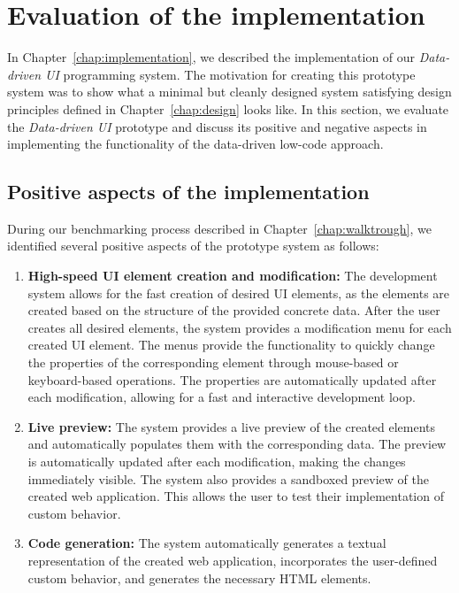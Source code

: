 \section{Evaluation of the implementation}

In Chapter~\ref{chap:implementation}, we described the implementation of our \emph{Data-driven UI} programming system.
The motivation for creating this prototype system was to show what a minimal but cleanly designed system satisfying design principles defined in Chapter~\ref{chap:design} looks like.
In this section, we evaluate the \emph{Data-driven UI} prototype and discuss its positive and negative aspects in implementing the functionality of the data-driven low-code approach.

\subsection{Positive aspects of the implementation}
During our benchmarking process described in Chapter~\ref{chap:walktrough}, we identified several positive aspects of the prototype system as follows:

\begin{enumerate}
	\item \textbf{High-speed UI element creation and modification:}
	      The development system allows for the fast creation of desired UI elements, as the elements are created based on the structure of the provided concrete data.
	      After the user creates all desired elements, the system provides a modification menu for each created UI element.
	      The menus provide the functionality to quickly change the properties of the corresponding element through mouse-based or keyboard-based operations.
	      The properties are automatically updated after each modification, allowing for a fast and interactive development loop.
	\item \textbf{Live preview:}
	      The system provides a live preview of the created elements and
	      automatically populates them with the corresponding data.
	      The preview is automatically updated after each modification, making the changes immediately visible.
	      The system also provides a sandboxed preview of the created web application.
	      This allows the user to test their implementation of custom behavior.
	\item \textbf{Code generation:}
	      The system automatically generates a textual representation of the created web application, incorporates the user-defined custom behavior,
	      and generates the necessary HTML elements.
\end{enumerate}


